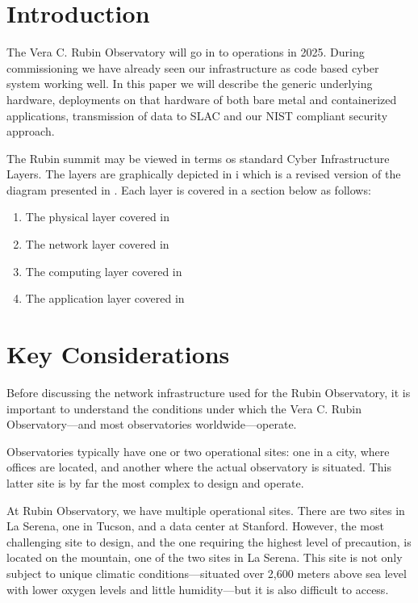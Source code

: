 \section{Introduction}

The Vera C. Rubin Observatory\cite{2019ApJ...873..111I} will go in to operations in 2025.
During commissioning we have already seen our infrastructure as code based cyber system working well.
In this paper we will describe the generic underlying hardware, deployments on that hardware of both bare metal and containerized applications, transmission of data to SLAC and our NIST\cite{NIST.SP.800-171} compliant security approach.

The Rubin summit may be viewed in terms os standard Cyber Infrastructure Layers.
The layers are graphically depicted in i which is a revised version of the diagram presented in \cite{2019arXiv190713060O}.
Each layer is covered in a section below as follows:

\begin{enumerate}
\item The physical layer covered in 
\item The network layer covered in 
\item The computing layer covered in 
\item The application layer covered in 
\end{enumerate}

\section{Key Considerations}
Before discussing the network infrastructure used for the Rubin Observatory, it is important to understand the conditions under which the Vera C. Rubin Observatory—and most observatories worldwide—operate. 

Observatories typically have one or two operational sites: one in a city, where offices are located, and another where the actual observatory is situated. This latter site is by far the most complex to design and operate.

At Rubin Observatory, we have multiple operational sites. There are two sites in La Serena, one in Tucson, and a data center at Stanford. However, the most challenging site to design, and the one requiring the highest level of precaution, is located on the mountain, one of the two sites in La Serena. This site is not only subject to unique climatic conditions—situated over 2,600 meters above sea level with lower oxygen levels and little humidity—but it is also difficult to access.

